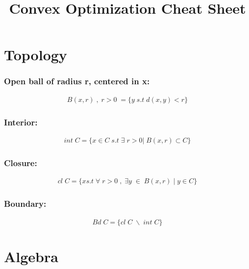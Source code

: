 \documentclass[a4paper,10pt]{report}
\title{Convex Optimization Cheat Sheet}
\author{}
\begin{document}
\maketitle

\begin{abstract}
\end{abstract}


\section{Topology}

\subsubsection{Open ball of radius r, centered in x:}

  \begin{align}
    B(x,r) \; , \; r>0 \; = \{ y \; s.t \; d(x,y)<r \} 
  \end{align}

\subsubsection{Interior:}

  \begin{align}
    int \; C = \{ x \in C \; s.t \; \exists \; r > 0 | \; B(x,r) \subset C  \} 
  \end{align}

\subsubsection{Closure:}

  \begin{align}
    cl \; C = \{ x s.t \; \forall \; r > 0 \; , \; \exists y \; \in \; B(x,r) \; | \; y \in C  \} 
  \end{align}
  
\subsubsection{Boundary:}

  \begin{align}
    Bd \; C = \{ cl \; C \; \backslash \; int \; C \} 
  \end{align}

\section{Algebra}
\end{document}
